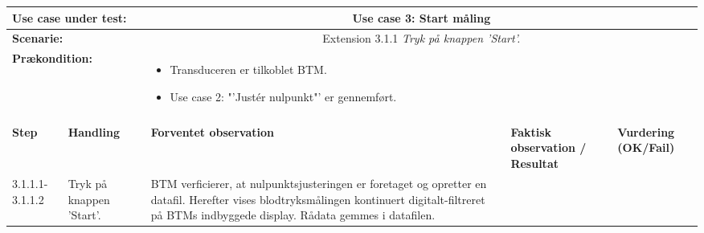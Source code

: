 \begin{tabular}{|p{1cm}|p{3cm}|p{4cm}|p{4cm}|p{2cm}|}
\hline
\multicolumn{2}{|p{3cm}|}{\textbf{Use case under test:}} & \multicolumn{3}{c|}{Use case 3: Start måling} \\\hline

\multicolumn{2}{|p{3cm}|}{\textbf{Scenarie:}} & \multicolumn{3}{c|}{Extension 3.1.1 \textit{Tryk på knappen 'Start'.}} \\\hline

\multicolumn{2}{|p{3cm}|}{\textbf{Prækondition:}}  & \multicolumn{3}{l|}{\parbox{0.6\textwidth}{
\begin{itemize}[label=$\circ$]
\item Transduceren er tilkoblet BTM.
\item Use case 2: "'Justér nulpunkt"' er gennemført. 
\end{itemize} }}\\\hline

\multicolumn{5}{|c|}{} \\\hline

\textbf{Step} & \textbf{Handling} & \textbf{Forventet observation} & \textbf{Faktisk observation / Resultat} & \textbf{Vurdering (OK/Fail)}\\\hline

3.1.1.1-3.1.1.2 & Tryk på knappen 'Start'. & BTM verficierer, at nulpunktsjusteringen er foretaget og opretter en datafil. Herefter vises blodtryksmålingen kontinuert digitalt-filtreret på BTMs indbyggede display. Rådata gemmes i datafilen. & & \\\hline

\end{tabular}

\newpage

